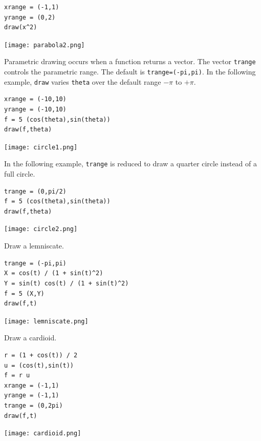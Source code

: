 \documentclass[12pt]{article}
\begin{document}
{\color{blue}
\begin{verbatim}
xrange = (-1,1)
yrange = (0,2)
draw(x^2)
\end{verbatim}}

\begin{center}
\texttt{[image: parabola2.png]}
\end{center}

Parametric drawing occurs when a function returns a vector.
The vector \verb$trange$ controls the parametric range.
The default is \verb$trange=(-pi,pi)$.
In the following example, \verb$draw$ varies \verb$theta$
over the default range $-\pi$ to $+\pi$.

{\color{blue}
\begin{verbatim}
xrange = (-10,10)
yrange = (-10,10)
f = 5 (cos(theta),sin(theta))
draw(f,theta)
\end{verbatim}}

\begin{center}
\texttt{[image: circle1.png]}
\end{center}

In the following example, \verb$trange$ is reduced
to draw a quarter circle instead of a full circle.

{\color{blue}
\begin{verbatim}
trange = (0,pi/2)
f = 5 (cos(theta),sin(theta))
draw(f,theta)
\end{verbatim}}

\begin{center}
\texttt{[image: circle2.png]}
\end{center}

Draw a lemniscate.

{\color{blue}
\begin{verbatim}
trange = (-pi,pi)
X = cos(t) / (1 + sin(t)^2)
Y = sin(t) cos(t) / (1 + sin(t)^2)
f = 5 (X,Y)
draw(f,t)
\end{verbatim}}

\begin{center}
\texttt{[image: lemniscate.png]}
\end{center}

Draw a cardioid.

{\color{blue}
\begin{verbatim}
r = (1 + cos(t)) / 2
u = (cos(t),sin(t))
f = r u
xrange = (-1,1)
yrange = (-1,1)
trange = (0,2pi)
draw(f,t)
\end{verbatim}}

\begin{center}
\texttt{[image: cardioid.png]}
\end{center}
\end{document}
